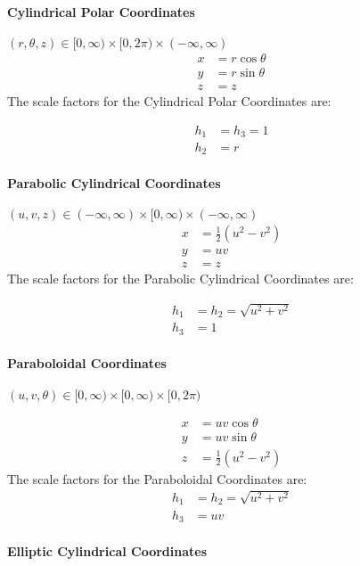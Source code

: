 \paragraph{Cylindrical Polar Coordinates} 

\((r, \theta, z)\in[0,\infty)\times[0,2\pi)\times(-\infty,\infty)\)
\begin{align}
x&=r\cos\theta \\
y&=r\sin\theta \\
z&=z
\end{align}
The scale factors for the Cylindrical Polar Coordinates are:

\begin{align}
h_1&=h_3=1 \\
h_2&=r
\end{align}
\paragraph{Parabolic Cylindrical
Coordinates} 

\((u, v, z)\in(-\infty,\infty)\times[0,\infty)\times(-\infty,\infty)\)
\begin{align}
x&=\frac{1}{2}(u^2-v^2)\\
y&=uv\\
z&=z
\end{align}
The scale factors for the Parabolic Cylindrical
Coordinates are:

\begin{align}
h_1&=h_2=\sqrt{u^2+v^2} \\
h_3&=1
\end{align}
\paragraph{Paraboloidal Coordinates} 

\((u, v, \theta)\in[0,\infty)\times[0,\infty)\times[0,2\pi)\)

\begin{align}
x&=uv\cos\theta\\
y&=uv\sin\theta\\
z&=\frac{1}{2}(u^2-v^2)
\end{align}
The scale factors for the Paraboloidal Coordinates are:
\begin{align}
h_1&=h_2=\sqrt{u^2+v^2} \\
h_3&=uv
\end{align}
\paragraph{Elliptic Cylindrical
Coordinates} 

